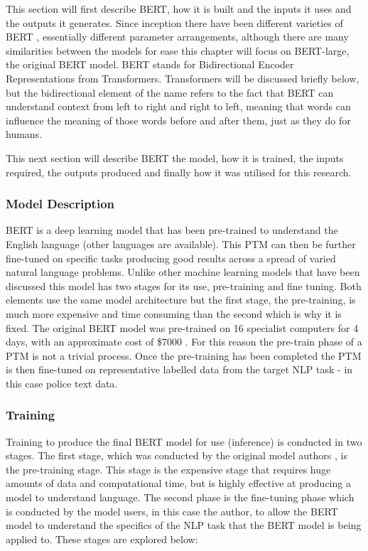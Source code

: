 This section will first describe BERT, how it is built and the inputs it uses and the outputs it generates. Since inception there have been different varieties of BERT \parencite{rogers2020primer}, essentially different parameter arrangements, although there are many similarities between the models for ease this chapter will focus on BERT-large, the original BERT model. BERT stands for Bidirectional Encoder Representations from Transformers. Transformers will be discussed briefly below, but the bidirectional element of the name refers to the fact that BERT can understand context from left to right and right to left, meaning that words can influence the meaning of those words before and after them, just as they do for humans.

This next section will describe BERT the model, how it is trained, the inputs required, the outputs produced and finally how it was utilised for this research.

\subsubsection{Model Description} BERT is a deep learning model that has been pre-trained to understand the English language (other languages are available). This PTM can then be further fine-tuned on specific tasks producing good results across a spread of varied natural language problems. Unlike other machine learning models that have been discussed this model has two stages for its use, pre-training and fine tuning. Both elements use the same model architecture but the first stage, the pre-training, is much more expensive and time consuming than the second which is why it is fixed. The original BERT model was pre-trained on 16 specialist computers for 4 days, with an approximate cost of \$7000 \parencite{devlin2018bert}. For this reason the pre-train phase of a PTM is not a trivial process. Once the pre-training has been completed the PTM is then fine-tuned on representative labelled data from the target NLP task - in this case police text data.

\subsubsection{Training} Training to produce the final BERT model for use (inference) is conducted in two stages. The first stage, which was conducted by the original model authors \parencite{devlin2018bert}, is the pre-training stage. This stage is the expensive stage that requires huge amounts of data and computational time, but is highly effective at producing a model to understand language. The second phase is the fine-tuning phase which is conducted by the model users, in this case the author, to allow the BERT model to understand the specifics of the NLP task that the BERT model is being applied to. These stages are explored below: 

